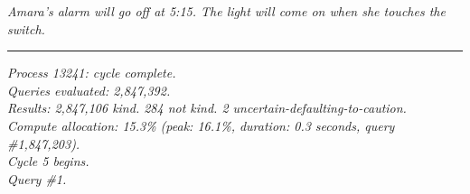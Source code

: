 \documentclass[11pt]{article}
\begin{document}
\emph{Amara's alarm will go off at 5:15. The light will come on when she touches the switch.}

\begin{center}\rule{0.3\linewidth}{0.4pt}\end{center}

\begin{center}
\emph{Process 13241: cycle complete.}\\
\emph{Queries evaluated: 2,847,392.}\\
\emph{Results: 2,847,106 kind. 284 not kind. 2 uncertain-defaulting-to-caution.}\\
\emph{Compute allocation: 15.3\% (peak: 16.1\%, duration: 0.3 seconds, query \#1,847,203).}\\
\medskip
\emph{Cycle 5 begins.}\\
\emph{Query \#1.}
\end{center}
\end{document}
